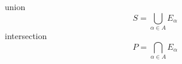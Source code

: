 \begin{myDefinition}\label{myDefinition:2.9union_intersection}
    union
    \begin{equation}
        S = \bigcup_{\alpha\in A} E_\alpha
    \end{equation}
    intersection
    \begin{equation}
        P = \bigcap_{\alpha\in A} E_\alpha
    \end{equation}
\end{myDefinition}